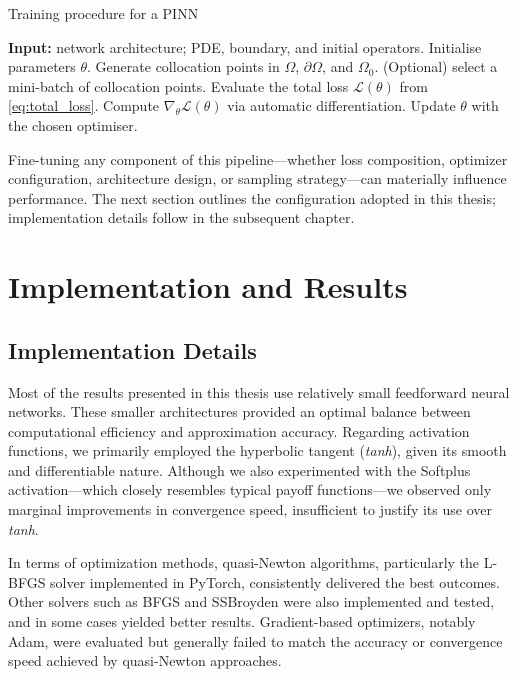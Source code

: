 \documentclass[12pt]{report} %
\theoremstyle{plain} %
\theoremstyle{definition} %
\theoremstyle{remark} %
\begin{document}
\begin{algorithm}[H]
\caption{Training procedure for a PINN}
\begin{algorithmic}[1]
\STATE \textbf{Input:} network architecture; PDE, boundary, and initial operators.
\STATE Initialise parameters $\theta$.
\STATE Generate collocation points in $\Omega$, $\partial\Omega$, and $\Omega_0$.
\STATE (Optional) select a mini-batch of collocation points.
\STATE Evaluate the total loss $\mathcal{L}(\theta)$ from \eqref{eq:total_loss}.
\STATE Compute $\nabla_\theta\mathcal{L}(\theta)$ via automatic differentiation.
\STATE Update $\theta$ with the chosen optimiser.
\ENDWHILE
\end{algorithmic}
\label{alg:training_pinns}
\end{algorithm}

Fine-tuning any component of this pipeline—whether loss composition, optimizer configuration, architecture design, 
or sampling strategy—can materially influence performance. The next section outlines the configuration adopted in 
this thesis; implementation details follow in the subsequent chapter.

\chapter{Implementation and Results}

\section{Implementation Details}

Most of the results presented in this thesis use relatively small feedforward neural networks. These smaller 
architectures provided an optimal balance between computational efficiency and approximation accuracy. 
Regarding activation functions, we primarily employed the hyperbolic tangent (\emph{tanh}), given its smooth and differentiable nature. 
Although we also experimented with the Softplus activation—which closely resembles typical payoff functions—we observed only marginal 
improvements in convergence speed, insufficient to justify its use over \emph{tanh}.

In terms of optimization methods, quasi-Newton algorithms, particularly the L-BFGS solver implemented in PyTorch, consistently 
delivered the best outcomes. Other solvers such as BFGS and SSBroyden were also implemented and tested, and in some cases yielded better results. 
Gradient-based optimizers, notably Adam, were evaluated but generally failed to match the 
accuracy or convergence speed achieved by quasi-Newton approaches.
\end{document}
